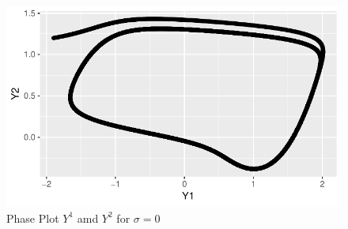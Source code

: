 \documentclass[a4paper]{article}
\begin{document}
\begin{figure}[ht!]
    \centering
    \includegraphics[width=\textwidth]{part1a-sigma0-Y1Y2.pdf}
    \caption{Phase Plot $Y^1$ amd $Y^2$ for $\sigma = 0$}\label{fig:part1a-sigma0-Y1Y2}
\end{figure}
\end{document}
